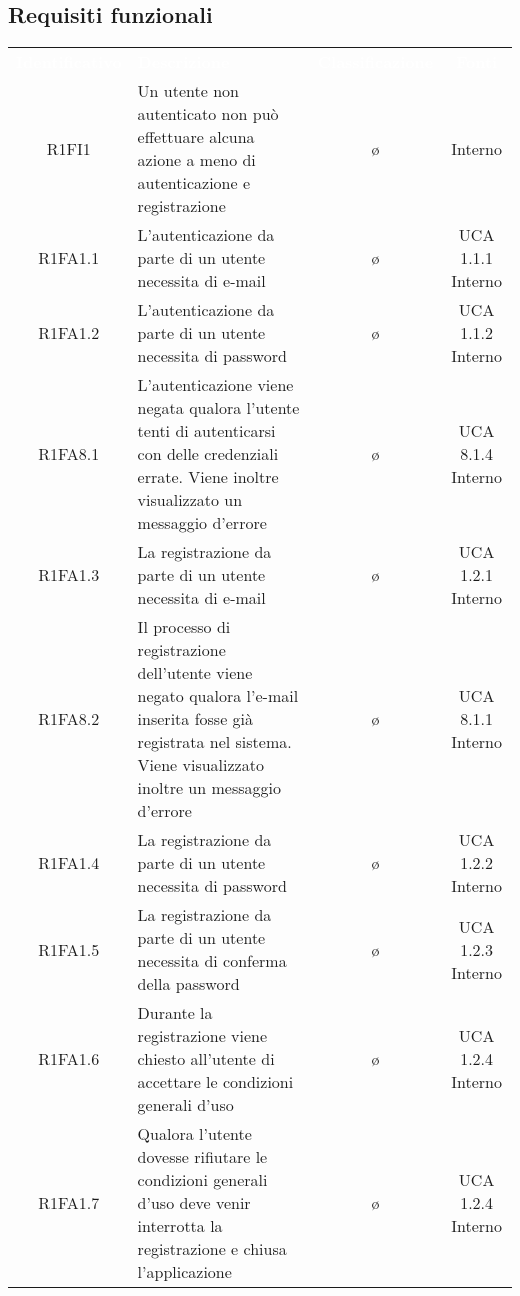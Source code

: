 \subsection{Requisiti funzionali}
{
\renewcommand{\arraystretch}{1.5}
\centering
\begin{longtable}{ c C{4cm} c c}
\textcolor{white}{\textbf{Identificativo}} & \textcolor{white}{\textbf{Descrizione}} & \textcolor{white}{\textbf{Classificazione}} & \textcolor{white}{\textbf{Fonti}}\\	

R1FI1 & Un utente non autenticato non può effettuare alcuna azione a meno di autenticazione e registrazione & \o & Interno\\

R1FA1.1 & L'autenticazione da parte di un utente necessita di e-mail & \o & UCA 1.1.1 Interno\\

R1FA1.2 & L'autenticazione da parte di un utente necessita di password & \o & UCA 1.1.2 Interno\\

R1FA8.1 & L'autenticazione viene negata qualora l'utente tenti di autenticarsi con delle credenziali errate. Viene inoltre visualizzato un messaggio d'errore & \o & UCA 8.1.4 Interno\\

R1FA1.3 & La registrazione da parte di un utente necessita di e-mail & \o & UCA 1.2.1 Interno\\

R1FA8.2 & Il processo di registrazione dell'utente viene negato qualora l'e-mail inserita fosse già registrata nel sistema. Viene visualizzato inoltre un messaggio d'errore & \o & UCA 8.1.1 Interno\\

R1FA1.4 & La registrazione da parte di un utente necessita di password & \o & UCA 1.2.2 Interno\\

R1FA1.5 & La registrazione da parte di un utente necessita di conferma della password & \o & UCA 1.2.3 Interno\\

R1FA1.6 & Durante la registrazione viene chiesto all'utente di accettare le condizioni generali d'uso & \o & UCA 1.2.4 Interno\\

R1FA1.7 & Qualora l'utente dovesse rifiutare le condizioni generali d'uso deve venir interrotta la registrazione e chiusa l'applicazione & \o & UCA 1.2.4 Interno\\


\end{longtable}}
